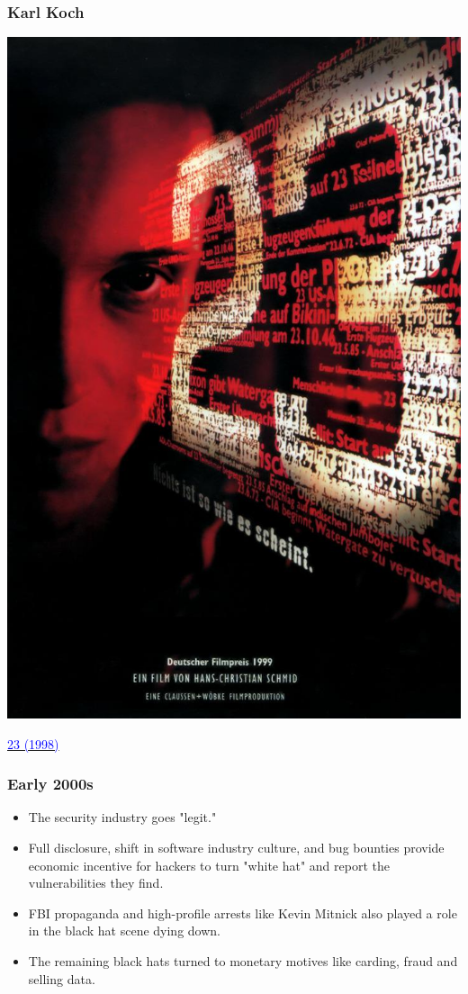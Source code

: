 \documentclass[aspectratio=169,usenames,dvipsnames]{beamer}
\begin{document}
\begin{frame}[c]
  \frametitle{Karl Koch}

  \centering

  \includegraphics[width=\textwidth,height=0.75\textheight,keepaspectratio]{img/23.jpg}

  \footnotesize
  \href{https://www.imdb.com/title/tt0126765/}{\textcolor{blue}{23 (1998)}}
\end{frame}

\begin{frame}
  \frametitle{Early 2000s}

  \begin{itemize}[<+->]
    \item The security industry goes "legit."
    \item Full disclosure, shift in software industry culture, and bug
      bounties provide economic incentive for hackers to turn "white hat" and
      report the vulnerabilities they find.
    \item FBI propaganda and high-profile arrests like Kevin Mitnick also
      played a role in the black hat scene dying down.
    \item The remaining black hats turned to monetary motives like
      carding, fraud and selling data.
  \end{itemize}
\end{frame}
\end{document}
